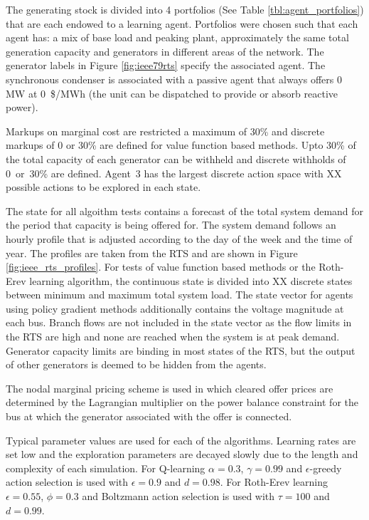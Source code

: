 The generating stock is divided into 4 portfolios (See Table
\ref{tbl:agent_portfolios}) that are each endowed to a learning agent.
Portfolios were chosen such that each agent has: a mix of base load and peaking
plant, approximately the same total generation capacity and generators in
different areas of the network.  The generator labels in Figure
\ref{fig:ieee79rts} specify the associated agent.  The synchronous condenser is
associated with a passive agent that always offers 0 MW at 0~\$/MWh (the
unit can be dispatched to provide or absorb reactive power).

Markups on marginal cost are restricted a maximum of 30\% and discrete markups
of 0 or 30\% are defined for value function based methods.  Upto 30\% of the
total capacity of each generator can be withheld and discrete withholds of
0~or~30\% are defined.  Agent~3 has the largest discrete action space with XX
possible actions to be explored in each state.

The state for all algoithm tests contains a forecast of the total system demand
for the period that capacity is being offered for.  The system demand follows an
hourly profile that is adjusted according to the day of the week and the time of
year.  The profiles are taken from the RTS and are shown in Figure
\ref{fig:ieee_rts_profiles}.  For tests of value function based methods or the
Roth-Erev learning algorithm, the continuous state is divided into XX discrete
states between minimum and maximum total system load.  The state vector for
agents using policy gradient methods additionally contains the voltage magnitude
at each bus.  Branch flows are not included in the state vector as the flow
limits in the RTS are high and none are reached when the system is at peak
demand.  Generator capacity limits are binding in most states of the RTS, but
the output of other generators is deemed to be hidden from the agents.

The nodal marginal pricing scheme is used in which cleared offer prices are
determined by the Lagrangian multiplier on the power balance constraint for the
bus at which the generator associated with the offer is connected.

Typical parameter values are used for each of the algorithms.  Learning rates
are set low and the exploration parameters are decayed slowly due to the length
and complexity of each simulation.  For Q-learning $\alpha=0.3$, $\gamma=0.99$
and $\epsilon$-greedy action selection is used with $\epsilon=0.9$ and $d=0.98$.
For Roth-Erev learning $\epsilon=0.55$, $\phi=0.3$ and Boltzmann action
selection is used with $\tau=100$ and $d=0.99$.

